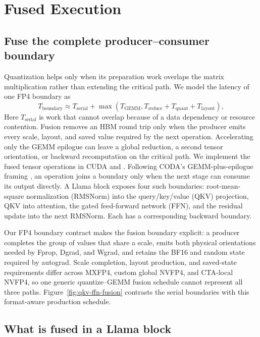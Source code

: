 \section{Fused Execution}
\label{sec:method}

\subsection{Fuse the complete producer--consumer boundary}

Quantization helps only when its preparation work overlaps the matrix
multiplication rather than extending the critical path. We model the latency
of one FP4 boundary as
\begin{equation}
  T_{\mathrm{boundary}} \approx T_{\mathrm{serial}} +
  \max\!\left(T_{\mathrm{GEMM}},
  T_{\mathrm{reduce}}+T_{\mathrm{quant}}+T_{\mathrm{layout}}\right),
  \label{eq:boundary-cost}
\end{equation}
Here $T_{\mathrm{serial}}$ is work that cannot overlap because of a data
dependency or resource contention. Fusion removes an HBM round trip only when
the producer emits every scale, layout, and saved value required by the next
operation. Accelerating only the GEMM epilogue can leave a global reduction, a
second tensor orientation, or backward recomputation on the critical path.
We implement the fused tensor operations in CUDA and \tk{}
\cite{spector2024thunderkittens}. Following CODA's GEMM-plus-epilogue framing
\cite{guo2026coda}, an operation joins a boundary only when the next stage can
consume its output directly. A Llama block exposes four such boundaries:
root-mean-square normalization (RMSNorm) into the query/key/value (QKV)
projection, QKV into attention, the gated feed-forward network (FFN), and the
residual update into the next RMSNorm. Each has a corresponding backward
boundary.

Our FP4 boundary contract makes the fusion boundary explicit: a producer
completes the group of values that share a scale, emits
both physical orientations needed by Fprop, Dgrad, and Wgrad, and retains the
BF16 and random state required by autograd. Scale completion, layout
production, and saved-state requirements differ across MXFP4, custom global
NVFP4, and CTA-local NVFP4, so one generic quantize--GEMM fusion schedule
cannot represent all three paths.
Figure~\ref{fig:qkv-ffn-fusion} contrasts the serial boundaries with this
format-aware production schedule.

\subsection{What is fused in a Llama block}

